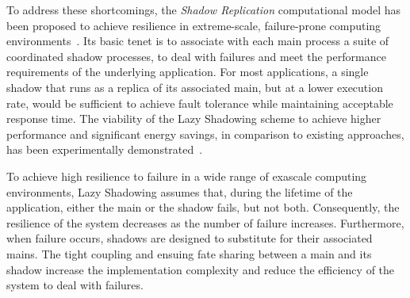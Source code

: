 To address these shortcomings, the {\it Shadow Replication} computational model %
has been proposed to achieve resilience in extreme-scale, failure-prone computing environments~\cite{mills2014energy,mills2014power,cui_en7085151}. Its basic tenet is to associate with each main process a suite of coordinated shadow processes, %
to deal with failures and meet the performance requirements of the underlying application. 
For most applications, %
a single shadow that runs as a replica of its associated main, but at a lower execution rate, would be sufficient to achieve fault tolerance while maintaining acceptable response time. 
The viability of the Lazy Shadowing scheme to achieve higher performance and significant energy savings, in comparison to existing approaches, has been experimentally demonstrated~\cite{cui_2016_scalcom}. 

To achieve high resilience to failure in a wide range of exascale computing environments, Lazy Shadowing assumes that, during the lifetime of the application, either the main or the shadow fails, but not both. Consequently, the resilience of the system decreases as the number of failure increases. Furthermore, when failure occurs, shadows are designed to substitute for their associated mains. The tight coupling and ensuing fate sharing between a main and its shadow increase the implementation complexity and reduce the efficiency of the system to deal with failures. 

